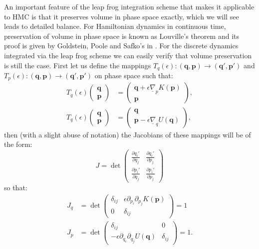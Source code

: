 \documentclass[12pt]{article}
\begin{document}
            An important feature of the leap frog integration scheme that makes it applicable to HMC is that it preserves volume in phase space exactly, which we will see leads to detailed balance. For Hamiltonian dynamics in continuous time, preservation of volume in phase space is known as Louville's theorem and its proof is given by Goldstein, Poole and Safko's in \cite{goldstein_poole_safko_2014}. For the discrete dynamics integrated via the leap frog scheme we can easily verify that volume preservation is still the case. First let us define the mappings $T_q\left(\epsilon\right): \left(\bm{q},\bm{p}\right) \rightarrow \left(\bm{q}',\bm{p}'\right) $ and $T_p\left(\epsilon\right): \left(\bm{q},\bm{p}\right) \rightarrow \left(\bm{q}',\bm{p}'\right)$ on phase space such that:
            \begin{align}
                \label{eq:psMap1}
                T_q\left(\epsilon\right)\begin{pmatrix} \bm{q} \\ \bm{p} \end{pmatrix} & = \begin{pmatrix} \bm{q} +\epsilon \underline{\nabla}_pK\left(\bm{p}\right) \\ \bm{p} \end{pmatrix}, \\
                \label{eq:psMap2}
                T_q\left(\epsilon\right)\begin{pmatrix} \bm{q} \\ \bm{p} \end{pmatrix} & = \begin{pmatrix} \bm{q} \\ \bm{p} - \epsilon \underline{\nabla}_qU\left(\bm{q}\right) \end{pmatrix},
            \end{align}
            then (with a slight abuse of notation) the Jacobians of these mappings will be of the form:
            \begin{equation}
                J = \det\begin{pmatrix}\frac{\partial q_i'}{\partial q_j} & \frac{\partial q_i'}{\partial p_j} \\ \frac{\partial p_i'}{\partial q_j} & \frac{\partial p_i'}{\partial p_j} \end{pmatrix}
            \end{equation}
            so that:
            \begin{align}
            J_q& =\det\begin{pmatrix} \delta_{ij} & \epsilon\partial_{p_i}\partial_{p_j}K\left(\bm{p}\right) \\ 0 & \delta_{ij} \end{pmatrix} = 1 \\
            J_p& =\det\begin{pmatrix} \delta_{ij} &  0  \\ -\epsilon\partial_{q_i}\partial_{q_j}U\left(\bm{q}\right) & \delta_{ij} \end{pmatrix} = 1.
            \end{align}
\end{document}
